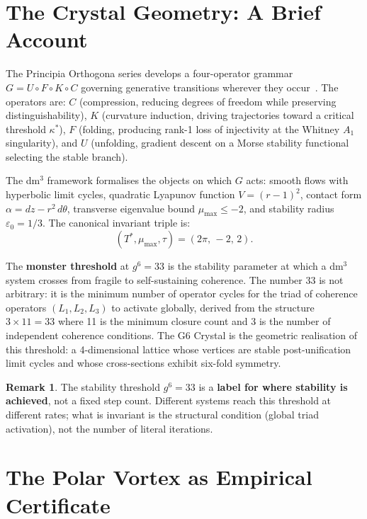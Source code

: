 \documentclass[11pt]{article}
\theoremstyle{plain}
\theoremstyle{definition}
\newtheorem{remark}{Remark}
\begin{document}
\section{The Crystal Geometry: A Brief Account}

The Principia Orthogona series develops a four-operator grammar
$G = U \circ F \circ K \circ C$ governing generative transitions
wherever they occur~\cite{grossi2026gomc}. The operators are:
$C$ (compression, reducing degrees of freedom while preserving
distinguishability), $K$ (curvature induction, driving trajectories
toward a critical threshold $\kappa^*$), $F$ (folding, producing
rank-1 loss of injectivity at the Whitney $A_1$ singularity), and
$U$ (unfolding, gradient descent on a Morse stability functional
selecting the stable branch).

The dm$^3$ framework formalises the objects on which $G$ acts: smooth
flows with hyperbolic limit cycles, quadratic Lyapunov function
$V = (r-1)^2$, contact form $\alpha = dz - r^2\,d\theta$, transverse
eigenvalue bound $\mu_{\max} \le -2$, and stability radius
$\varepsilon_0 = 1/3$. The canonical invariant triple is:
\[
(T^*, \mu_{\max}, \tau) = (2\pi,\, -2,\, 2).
\]

The \textbf{monster threshold} at $g^6 = 33$ is the stability
parameter at which a dm$^3$ system crosses from fragile to
self-sustaining coherence. The number 33 is not arbitrary: it is
the minimum number of operator cycles for the triad of coherence
operators $(L_1, L_2, L_3)$ to activate globally, derived from the
structure $3 \times 11 = 33$ where 11 is the minimum closure
count and 3 is the number of independent coherence conditions.
The G6 Crystal is the geometric realisation of this threshold: a
4-dimensional lattice whose vertices are stable post-unification
limit cycles and whose cross-sections exhibit six-fold symmetry.

\begin{remark}
The stability threshold $g^6 = 33$ is a \textbf{label for where
stability is achieved}, not a fixed step count. Different systems
reach this threshold at different rates; what is invariant is the
structural condition (global triad activation), not the number of
literal iterations.
\end{remark}

\section{The Polar Vortex as Empirical Certificate}
\end{document}

